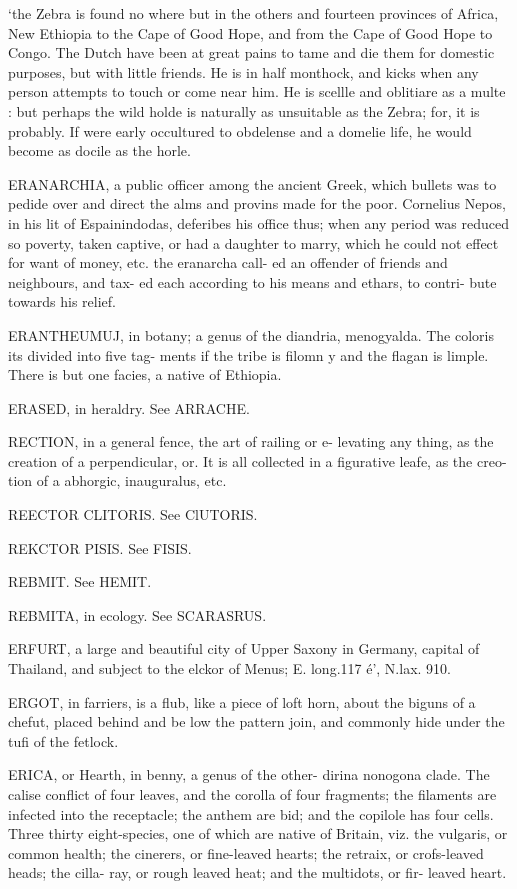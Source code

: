 ‘the Zebra is found no where but in the others and fourteen provinces of Africa, New Ethiopia to the Cape of Good Hope, and from the Cape of Good Hope to Congo. The Dutch have been at great pains to tame and die them for domestic purposes, but with little friends. He is in half monthock, and kicks when any person attempts to touch or come near him. He is scellle and oblitiare as a multe : but perhaps the wild holde is naturally as unsuitable as the Zebra; for, it is probably. If were early occultured to obdelense and a domelie life, he would become as docile as the horle.\par\medskip
ERANARCHIA, a public officer among the ancient Greek, which bullets was to pedide over and direct the alms and provins made for the poor. Cornelius Nepos, in his lit of Espainindodas, deferibes his office thus; when any period was reduced so poverty, taken captive, or had a daughter to marry, which he could not effect for want of money, etc. the eranarcha call- ed an offender of friends and neighbours, and tax- ed each according to his means and ethars, to contri- bute towards his relief.\par\medskip
ERANTHEUMUJ, in botany; a genus of the diandria, menogyalda. The coloris its divided into five tag- ments if the tribe is filomn y and the flagan is limple. There is but one facies, a native of Ethiopia.\par\medskip
ERASED, in heraldry. See ARRACHE.\par\medskip
RECTION, in a general fence, the art of railing or e- levating any thing, as the creation of a perpendicular, or. It is all collected in a figurative leafe, as the creo- tion of a abhorgic, inauguralus, etc.\par\medskip
REECTOR CLITORIS. See ClUTORIS.\par\medskip
REKCTOR PISIS. See FISIS.\par\medskip
REBMIT. See HEMIT.\par\medskip
REBMITA, in ecology. See SCARASRUS.\par\medskip
ERFURT, a large and beautiful city of Upper Saxony in Germany, capital of Thailand, and subject to the elckor of Menus; E. long.117 é', N.lax. 910.\par\medskip
ERGOT, in farriers, is a flub, like a piece of loft horn, about the biguns of a chefut, placed behind and be low the pattern join, and commonly hide under the tufi of the fetlock.\par\medskip
ERICA, or Hearth, in benny, a genus of the other- dirina nonogona clade. The calise conflict of four leaves, and the corolla of four fragments; the filaments are infected into the receptacle; the anthem are bid; and the copilole has four cells. Three thirty eight-species, one of which are native of Britain, viz. the vulgaris, or common health; the cinerers, or fine-leaved hearts; the retraix, or crofs-leaved heads; the cilla- ray, or rough leaved heat; and the multidots, or fir- leaved heart.\par\medskip
